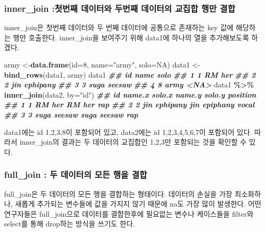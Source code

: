 \documentclass[
]{book}
\newenvironment{Shaded}{\begin{snugshade}}{\end{snugshade}}
\newcommand{\AttributeTok}[1]{\textcolor[rgb]{0.13,0.29,0.53}{#1}}
\newcommand{\ConstantTok}[1]{\textcolor[rgb]{0.56,0.35,0.01}{#1}}
\newcommand{\DecValTok}[1]{\textcolor[rgb]{0.00,0.00,0.81}{#1}}
\newcommand{\DocumentationTok}[1]{\textcolor[rgb]{0.56,0.35,0.01}{\textbf{\textit{#1}}}}
\newcommand{\FunctionTok}[1]{\textcolor[rgb]{0.13,0.29,0.53}{\textbf{#1}}}
\newcommand{\NormalTok}[1]{#1}
\newcommand{\OtherTok}[1]{\textcolor[rgb]{0.56,0.35,0.01}{#1}}
\newcommand{\SpecialCharTok}[1]{\textcolor[rgb]{0.81,0.36,0.00}{\textbf{#1}}}
\newcommand{\StringTok}[1]{\textcolor[rgb]{0.31,0.60,0.02}{#1}}
\begin{document}
\subsubsection{inner\_join :첫번째 데이터와 두번째 데이터의 교집합 행만 결합}\label{inner_join-uxccabuxbc88uxc9f8-uxb370uxc774uxd130uxc640-uxb450uxbc88uxc9f8-uxb370uxc774uxd130uxc758-uxad50uxc9d1uxd569-uxd589uxb9cc-uxacb0uxd569}

inner\_join은 첫번째 데이터와 두 번째 데이터에 공통으로 존재하는 key 값에 해당하는 행만 호출한다. inner\_join을 보여주기 위해 data1에 하나의 열을 추가해보도록 하겠다.

\begin{Shaded}
\begin{Highlighting}[]
\NormalTok{army }\OtherTok{\textless{}{-}}\FunctionTok{data.frame}\NormalTok{(}\AttributeTok{id=}\DecValTok{8}\NormalTok{, }\AttributeTok{name=}\StringTok{"army"}\NormalTok{, }\AttributeTok{solo=}\ConstantTok{NA}\NormalTok{)}
\NormalTok{data1 }\OtherTok{\textless{}{-}} \FunctionTok{bind\_rows}\NormalTok{(data1, army)}
\NormalTok{data1}
\DocumentationTok{\#\#   id name     solo}
\DocumentationTok{\#\# 1  1   RM      her}
\DocumentationTok{\#\# 2  2  jin ephipany}
\DocumentationTok{\#\# 3  3 suga   seesaw}
\DocumentationTok{\#\# 4  8 army     \textless{}NA\textgreater{}}
\NormalTok{data1 }\SpecialCharTok{\%\textgreater{}\%} 
  \FunctionTok{inner\_join}\NormalTok{(data2, }\AttributeTok{by=}\StringTok{"id"}\NormalTok{)}
\DocumentationTok{\#\#   id name.x   solo.x name.y   solo.y position}
\DocumentationTok{\#\# 1  1     RM      her     RM      her      rap}
\DocumentationTok{\#\# 2  2    jin ephipany    jin epiphany    vocal}
\DocumentationTok{\#\# 3  3   suga   seesaw   suga   seesaw      rap}
\end{Highlighting}
\end{Shaded}

data1에는 id 1,2,3,8이 포함되어 있고, data2에는 id 1,2,3,4,5,6,7이 포함되어 있다. 따라서 inner\_join의 결과는 두 데이터의 교집합인 1,2,3만 포함되는 것을 확인할 수 있다.

\subsubsection{full\_join : 두 데이터의 모든 행을 결합}\label{full_join-uxb450-uxb370uxc774uxd130uxc758-uxbaa8uxb4e0-uxd589uxc744-uxacb0uxd569}

full\_join은 두 데이터의 모든 행을 결합하는 형태이다. 데이터의 손실을 가장 최소화하나, 새롭게 추가되는 변수들에 값을 가지지 않기 때문에 na도 가장 많이 발생한다. 어떤 연구자들은 full\_join으로 데이터를 결합한후에 필요없는 변수나 케이스들을 filter와 select를 통해 drop하는 방식을 쓰기도 한다.
\end{document}
